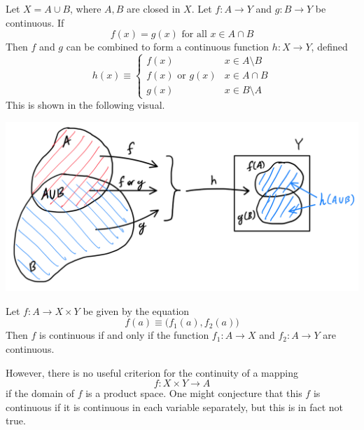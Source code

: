     \begin{lemma}
      Let $X = A \cup B$, where $A, B$ are closed in $X$. Let $f: A \longrightarrow Y$ and $g: B \longrightarrow Y$ be continuous. If 
      \begin{equation}
        f(x) = g(x) \text{ for all } x \in A \cap B
      \end{equation}
      Then $f$ and $g$ can be combined to form a continuous function $h: X \longrightarrow Y$, defined
      \begin{equation}
        h(x) \equiv \begin{cases}
          f(x) & x \in A \setminus B \\
          f(x) \text{ or } g(x) & x \in A \cap B \\
          g(x) & x \in B \setminus A
        \end{cases}
      \end{equation}
      This is shown in the following visual. 
      \begin{center}
          \includegraphics[scale=0.25]{img/Gluing_Lemma.PNG}
      \end{center}
    \end{lemma}

    \begin{theorem}
      Let $f: A \longrightarrow X \times Y$ be given by the equation 
      \begin{equation}
        f(a) \equiv \big( f_1 (a), f_2(a) \big)
      \end{equation}
      Then $f$ is continuous if and only if the function $f_1: A \longrightarrow X$ and $f_2: A \longrightarrow Y$ are continuous. 
    \end{theorem}

    However, there is no useful criterion for the continuity of a mapping 
    \begin{equation}
      f: X \times Y \longrightarrow A
    \end{equation}
    if the domain of $f$ is a product space. One might conjecture that this $f$ is continuous if it is continuous in each variable separately, but this is in fact not true. 

